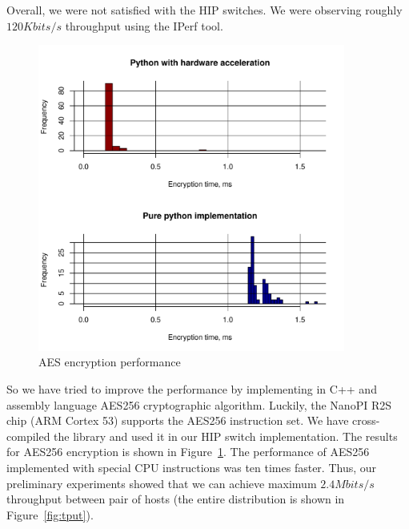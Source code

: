 
Overall, we were not satisfied with the HIP switches. We were observing 
roughly $120 Kbits/s$ throughput using the IPerf tool. 

\begin{figure}[h!]
\centering
\includegraphics[width=0.9\textwidth]{graphics/AES.pdf}
\caption{AES encryption performance}
\label{fig:aes}
\end{figure}

So we have tried to improve the performance by implementing in C++ and assembly language
AES256 cryptographic algorithm. Luckily, the NanoPI R2S chip (ARM Cortex 
53) supports the AES256 instruction set. We have cross-compiled the 
library and used it in our HIP switch implementation. The results for AES256 
encryption is shown in Figure~\ref{fig:aes}. The performance of AES256 
implemented with special CPU instructions was ten times faster. Thus, our 
preliminary experiments showed that we can achieve maximum $2.4 Mbits/s$ 
throughput between pair of hosts (the entire distribution is shown in Figure~\ref{fig:tput}).


